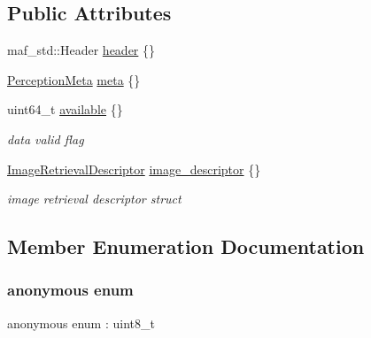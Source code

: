 \subsection*{Public Attributes}
\begin{DoxyCompactItemize}
\item 
maf\+\_\+std\+::\+Header \hyperlink{structmaf__perception__interface_1_1ImageRetrievalDescriptorPerception_a6d29a68cbf946e2525f7108367581229}{header} \{\}
\item 
\hyperlink{structmaf__perception__interface_1_1PerceptionMeta}{Perception\+Meta} \hyperlink{structmaf__perception__interface_1_1ImageRetrievalDescriptorPerception_ae2d87cc3549bad105892e80b7fd205b6}{meta} \{\}
\item 
uint64\+\_\+t \hyperlink{structmaf__perception__interface_1_1ImageRetrievalDescriptorPerception_a55f1c05e9d28d0afe050a1dc74b76a42}{available} \{\}
\begin{DoxyCompactList}\small\item\em data valid flag \end{DoxyCompactList}\item 
\hyperlink{structmaf__perception__interface_1_1ImageRetrievalDescriptor}{Image\+Retrieval\+Descriptor} \hyperlink{structmaf__perception__interface_1_1ImageRetrievalDescriptorPerception_ac0ae37e0f7c3d767ee674d7fe7d106df}{image\+\_\+descriptor} \{\}
\begin{DoxyCompactList}\small\item\em image retrieval descriptor struct \end{DoxyCompactList}\end{DoxyCompactItemize}


\subsection{Member Enumeration Documentation}
\mbox{\label{structmaf__perception__interface_1_1ImageRetrievalDescriptorPerception_a245d1a6b59d93ce20012a84d261f952b}} 
\subsubsection{\texorpdfstring{anonymous enum}{anonymous enum}}
{\footnotesize\ttfamily anonymous enum \+: uint8\+\_\+t}

